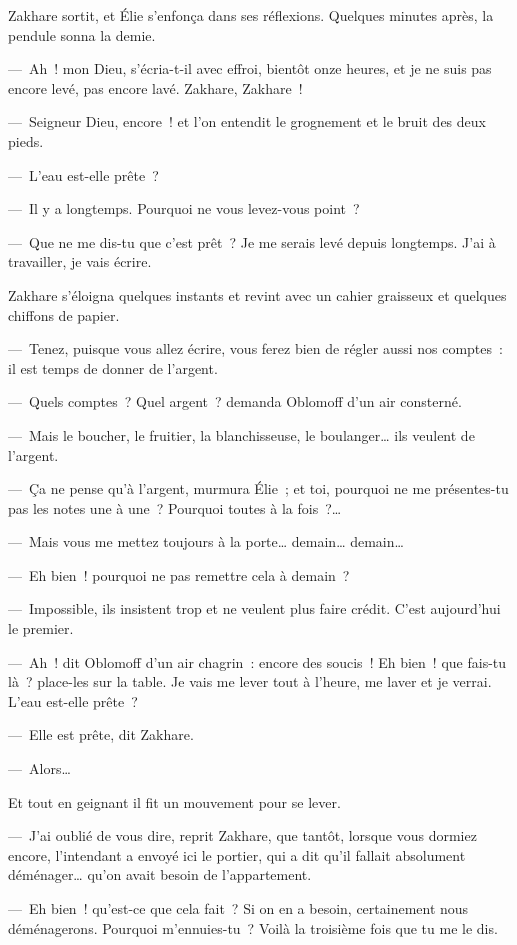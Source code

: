 \documentclass[french,twoside]{book} %
\begin{document}
Zakhare sortit, et Élie s’enfonça dans ses réflexions. Quelques minutes après, la pendule sonna la demie.\par
— Ah ! mon Dieu, s’écria-t-il avec effroi, bientôt onze heures, et je ne suis pas encore levé, pas encore lavé. Zakhare, Zakhare !\par
— Seigneur Dieu, encore ! et l’on entendit le grognement et le bruit des deux pieds.\par
— L’eau est-elle prête ?\par
— Il y a longtemps. Pourquoi ne vous levez-vous point ?\par
— Que ne me dis-tu que c’est prêt ? Je me serais levé depuis longtemps. J’ai à travailler, je vais écrire.\par
Zakhare s’éloigna quelques instants et revint avec un cahier graisseux et quelques chiffons de papier.\par
— Tenez, puisque vous allez écrire, vous ferez bien de régler aussi nos comptes : il est temps de donner de l’argent.\par
— Quels comptes ? Quel argent ? demanda Oblomoff d’un air consterné.\par
— Mais le boucher, le fruitier, la blanchisseuse, le boulanger… ils veulent de l’argent.\par
— Ça ne pense qu’à l’argent, murmura Élie ; et toi, pourquoi ne me présentes-tu pas les notes une à une ? Pourquoi toutes à la fois ?…\par
— Mais vous me mettez toujours à la porte… demain… demain…\par
— Eh bien ! pourquoi ne pas remettre cela à demain ?\par
— Impossible, ils insistent trop et ne veulent plus faire crédit. C’est aujourd’hui le premier.\par
— Ah ! dit Oblomoff d’un air chagrin : encore des soucis ! Eh bien ! que fais-tu là ? place-les sur la table. Je vais me lever tout à l’heure, me laver et je verrai. L’eau est-elle prête ?\par
— Elle est prête, dit Zakhare.\par
— Alors…\par
Et tout en geignant il fit un mouvement pour se lever.\par
— J’ai oublié de vous dire, reprit Zakhare, que tantôt, lorsque vous dormiez encore, l’intendant a envoyé ici le portier, qui a dit qu’il fallait absolument déménager… qu’on avait besoin de l’appartement.\par
— Eh bien ! qu’est-ce que cela fait ? Si on en a besoin, certainement nous déménagerons. Pourquoi m’ennuies-tu ? Voilà la troisième fois que tu me le dis.\par
\end{document}
